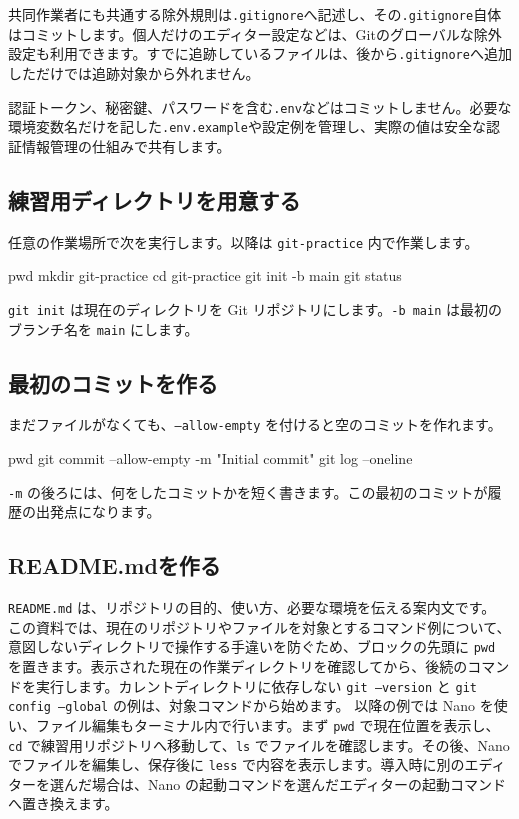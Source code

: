 \documentclass[a4paper,11pt]{jlreq}
\newcommand{\cmd}[1]{\texttt{#1}}
\begin{document}
共同作業者にも共通する除外規則は\cmd{.gitignore}へ記述し、その\cmd{.gitignore}自体はコミットします。個人だけのエディター設定などは、Gitのグローバルな除外設定も利用できます。すでに追跡しているファイルは、後から\cmd{.gitignore}へ追加しただけでは追跡対象から外れません\autocite{gitignore-reference}。

認証トークン、秘密鍵、パスワードを含む\cmd{.env}などはコミットしません。必要な環境変数名だけを記した\cmd{.env.example}や設定例を管理し、実際の値は安全な認証情報管理の仕組みで共有します。

\subsection{練習用ディレクトリを用意する}

任意の作業場所で次を実行します。以降は \cmd{git-practice} 内で作業します。

\begin{codeblock}
pwd
mkdir git-practice
cd git-practice
git init -b main
git status
\end{codeblock}

\cmd{git init} は現在のディレクトリを Git リポジトリにします。\cmd{-b main} は最初のブランチ名を \cmd{main} にします。

\subsection{最初のコミットを作る}

まだファイルがなくても、\cmd{--allow-empty} を付けると空のコミットを作れます。

\begin{codeblock}
pwd
git commit --allow-empty -m "Initial commit"
git log --oneline
\end{codeblock}

\cmd{-m} の後ろには、何をしたコミットかを短く書きます。この最初のコミットが履歴の出発点になります。

\subsection{README.mdを作る}

\cmd{README.md} は、リポジトリの目的、使い方、必要な環境を伝える案内文です。
この資料では、現在のリポジトリやファイルを対象とするコマンド例について、意図しないディレクトリで操作する手違いを防ぐため、ブロックの先頭に \cmd{pwd} を置きます。表示された現在の作業ディレクトリを確認してから、後続のコマンドを実行します。カレントディレクトリに依存しない \cmd{git --version} と \cmd{git config --global} の例は、対象コマンドから始めます。
以降の例では Nano を使い、ファイル編集もターミナル内で行います。まず \cmd{pwd} で現在位置を表示し、\cmd{cd} で練習用リポジトリへ移動して、\cmd{ls} でファイルを確認します。その後、Nano でファイルを編集し、保存後に \cmd{less} で内容を表示します。導入時に別のエディターを選んだ場合は、Nano の起動コマンドを選んだエディターの起動コマンドへ置き換えます。
\end{document}
